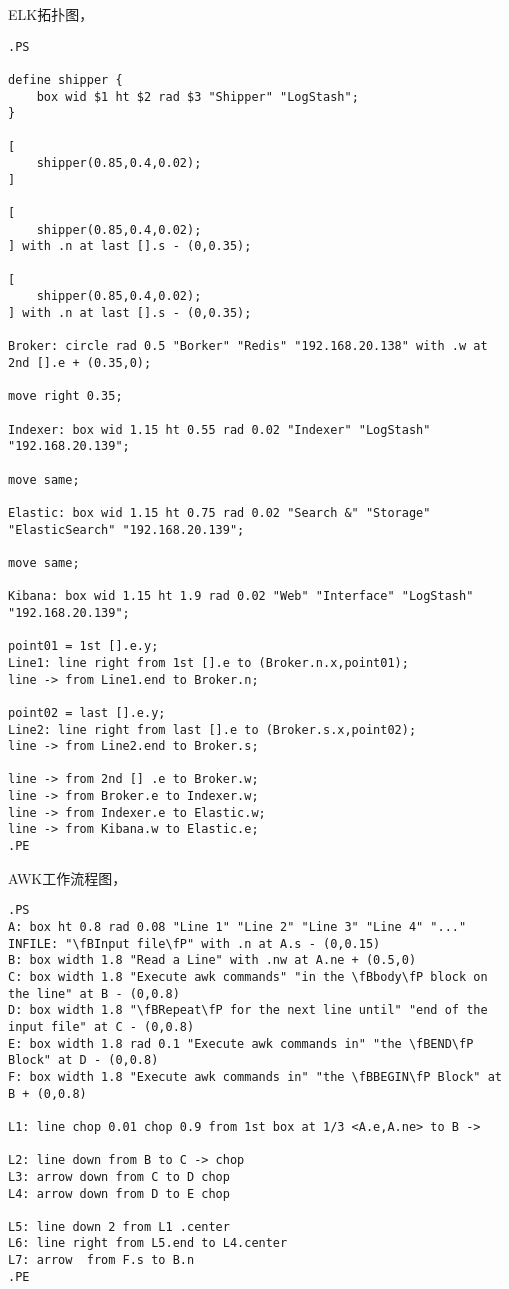 ELK拓扑图，

\begin{verbatim}
.PS

define shipper {
	box wid $1 ht $2 rad $3 "Shipper" "LogStash";
}

[
	shipper(0.85,0.4,0.02);
]

[
	shipper(0.85,0.4,0.02);
] with .n at last [].s - (0,0.35);

[
	shipper(0.85,0.4,0.02);
] with .n at last [].s - (0,0.35);

Broker: circle rad 0.5 "Borker" "Redis" "192.168.20.138" with .w at 2nd [].e + (0.35,0);

move right 0.35;

Indexer: box wid 1.15 ht 0.55 rad 0.02 "Indexer" "LogStash" "192.168.20.139";

move same;

Elastic: box wid 1.15 ht 0.75 rad 0.02 "Search &" "Storage" "ElasticSearch" "192.168.20.139";

move same;

Kibana: box wid 1.15 ht 1.9 rad 0.02 "Web" "Interface" "LogStash" "192.168.20.139";

point01 = 1st [].e.y;
Line1: line right from 1st [].e to (Broker.n.x,point01);
line -> from Line1.end to Broker.n;

point02 = last [].e.y;
Line2: line right from last [].e to (Broker.s.x,point02);
line -> from Line2.end to Broker.s;

line -> from 2nd [] .e to Broker.w;
line -> from Broker.e to Indexer.w;
line -> from Indexer.e to Elastic.w;
line -> from Kibana.w to Elastic.e;
.PE
\end{verbatim}

AWK工作流程图，

\begin{verbatim}
.PS
A: box ht 0.8 rad 0.08 "Line 1" "Line 2" "Line 3" "Line 4" "..."
INFILE: "\fBInput file\fP" with .n at A.s - (0,0.15)
B: box width 1.8 "Read a Line" with .nw at A.ne + (0.5,0)
C: box width 1.8 "Execute awk commands" "in the \fBbody\fP block on the line" at B - (0,0.8)
D: box width 1.8 "\fBRepeat\fP for the next line until" "end of the input file" at C - (0,0.8)
E: box width 1.8 rad 0.1 "Execute awk commands in" "the \fBEND\fP Block" at D - (0,0.8)
F: box width 1.8 "Execute awk commands in" "the \fBBEGIN\fP Block" at B + (0,0.8)

L1: line chop 0.01 chop 0.9 from 1st box at 1/3 <A.e,A.ne> to B ->

L2: line down from B to C -> chop
L3: arrow down from C to D chop
L4: arrow down from D to E chop

L5: line down 2 from L1 .center
L6: line right from L5.end to L4.center
L7: arrow  from F.s to B.n
.PE
\end{verbatim}

